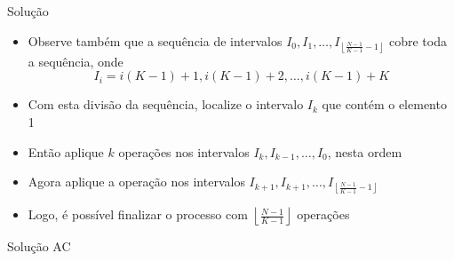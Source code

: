 \begin{frame}[fragile]{Solução}

    \begin{itemize}
        \item Observe também que a sequência de intervalos $I_0, I_1, \ldots, I_{\left\lfloor \frac{N - 1}{K - 1} - 1\right\rfloor}$ cobre toda a sequência, onde
        \[
            I_i = i(K - 1) + 1, i(K - 1) + 2, \ldots, i(K - 1) + K
        \]

        \item Com esta divisão da sequência, localize o intervalo $I_k$ que contém o elemento 1

        \item Então aplique $k$ operações nos intervalos $I_k, I_{k - 1}, \ldots, I_0$, nesta
            ordem

        \item Agora aplique a operação nos intervalos $I_{k + 1}, I_{k + 1}, \ldots, 
            I_{\left\lfloor \frac{N - 1}{K - 1} - 1\right\rfloor}$

        \item Logo, é possível finalizar o processo com  $\left\lfloor \frac{N - 1}{K - 1} \right\rfloor$
            operações
    \end{itemize}

\end{frame}

\begin{frame}[fragile]{Solução AC}
\end{frame}
